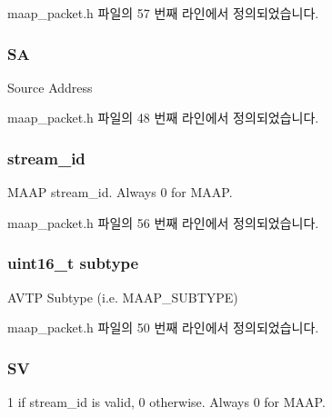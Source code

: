 maap\+\_\+packet.\+h 파일의 57 번째 라인에서 정의되었습니다.

\subsubsection[{\texorpdfstring{SA}{SA}}]{ SA}\hypertarget{struct_m_a_a_p___packet_a725bf85ec39adedda8b4adb109c29ded}{}\label{struct_m_a_a_p___packet_a725bf85ec39adedda8b4adb109c29ded}
Source Address 

maap\+\_\+packet.\+h 파일의 48 번째 라인에서 정의되었습니다.

\subsubsection[{\texorpdfstring{stream\+\_\+id}{stream_id}}]{ stream\+\_\+id}\hypertarget{struct_m_a_a_p___packet_af5af7b461263e29ceb91a8d3a8bc2c97}{}\label{struct_m_a_a_p___packet_af5af7b461263e29ceb91a8d3a8bc2c97}
M\+A\+AP stream\+\_\+id. Always 0 for M\+A\+AP. 

maap\+\_\+packet.\+h 파일의 56 번째 라인에서 정의되었습니다.

\subsubsection[{\texorpdfstring{subtype}{subtype}}]{\setlength{\rightskip}{0pt plus 5cm}uint16\+\_\+t subtype}\hypertarget{struct_m_a_a_p___packet_ac5d9ab8403fb9ca24facc32b821dd53b}{}\label{struct_m_a_a_p___packet_ac5d9ab8403fb9ca24facc32b821dd53b}
A\+V\+TP Subtype (i.\+e. {\ttfamily M\+A\+A\+P\+\_\+\+S\+U\+B\+T\+Y\+PE}) 

maap\+\_\+packet.\+h 파일의 50 번째 라인에서 정의되었습니다.

\subsubsection[{\texorpdfstring{SV}{SV}}]{ SV}\hypertarget{struct_m_a_a_p___packet_a86f6b56adf7c3c38c254b7f71dce6a6c}{}\label{struct_m_a_a_p___packet_a86f6b56adf7c3c38c254b7f71dce6a6c}
1 if stream\+\_\+id is valid, 0 otherwise. Always 0 for M\+A\+AP. 


